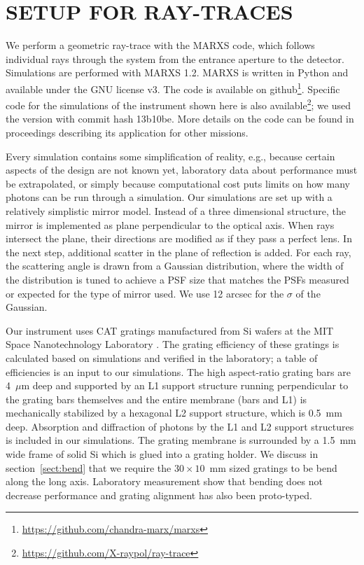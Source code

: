 \documentclass[]{spie}  %
\begin{document}
\section{SETUP FOR RAY-TRACES}
\label{sect:raytrace}
We perform a geometric ray-trace with the MARXS code, which follows
individual rays through the system from the entrance aperture to the
detector. Simulations are performed with MARXS
1.2\cite{marxs,marxs1.2}. MARXS is written in Python and available
under the GNU license v3. The code is available on
github\footnote{\url{https://github.com/chandra-marx/marxs}}. Specific
code for the simulations of the instrument shown here is also
available\footnote{\url{https://github.com/X-raypol/ray-trace}}; we
used the version with commit hash 13b10be. More details on the code
can be found in proceedings describing its application for other
missions\cite{10.1117/12.2525814,10.1117/12.2312678}.

Every simulation contains some simplification of reality, e.g.,
because certain aspects of the design are not known yet, laboratory
data about performance must be extrapolated, or simply because
computational cost puts limits on how many photons can be run through
a simulation. Our simulations are set up with a relatively simplistic
mirror model. Instead of a three dimensional structure, the mirror is
implemented as plane perpendicular to the optical axis. When rays
intersect the plane, their directions are modified as if they pass a
perfect lens. In the next step, additional scatter in the plane of
reflection is added. For each ray, the scattering angle is drawn from
a Gaussian distribution, where the width of the distribution is tuned
to achieve a PSF size that matches the PSFs measured or expected for
the type of mirror used. We use 12 arcsec for the $\sigma$ of the
Gaussian.

Our instrument uses CAT gratings manufactured from Si wafers at the
MIT Space Nanotechnology Laboratory
\cite{Heilmann:11,doi:10.1117/12.2188525,10.1117/12.2314180,10.1117/12.2529354}. The
grating efficiency of these gratings is calculated based on
simulations and verified in the laboratory; a table of efficiencies is
an input to our simulations. The high aspect-ratio grating bars are
4~$\mu$m deep and supported by an L1 support structure running
perpendicular to the grating bars themselves and the entire membrane
(bars and L1) is mechanically stabilized by a hexagonal L2 support
structure, which is 0.5~mm deep. Absorption and diffraction of photons
by the L1 and L2 support structures is included in our
simulations. The grating membrane is surrounded by a 1.5~mm wide frame
of solid Si which is glued into a grating holder. We discuss in
section~\ref{sect:bend} that we require the $30\times10$~mm sized
gratings to be bend along the long axis. Laboratory measurement show
that bending does not decrease performance\cite{10.1117/12.2274205}
and grating alignment has also been
proto-typed\cite{10.1117/12.2314902,10.1117/12.2529607}.
\end{document}
